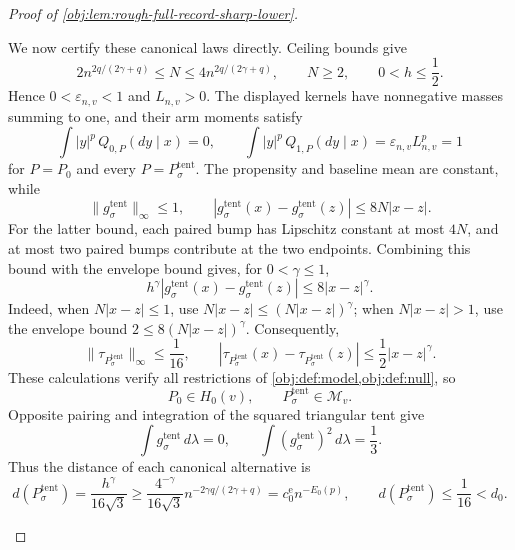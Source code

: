 \begin{proof}[Proof of \cref{obj:lem:rough-full-record-sharp-lower}]
\begin{enumerate}
We now certify these canonical laws directly. Ceiling bounds give
\[
2n^{2q/(2\gamma+q)}\le N\le4n^{2q/(2\gamma+q)},
\qquad N\ge2,
\qquad 0<h\le\frac12.
\]
Hence \(0<\varepsilon_{n,v}<1\) and \(L_{n,v}>0\). The displayed kernels have nonnegative masses summing to one, and their arm moments satisfy
\[
\int |y|^p\,Q_{0,P}(dy\mid x)=0,
\qquad
\int |y|^p\,Q_{1,P}(dy\mid x)
=\varepsilon_{n,v}L_{n,v}^p=1
\]
for \(P=P_0\) and every \(P=P^{\mathrm{tent}}_\sigma\).
The propensity and baseline mean are constant, while
\[
\|g^{\mathrm{tent}}_\sigma\|_\infty\le1,
\qquad
|g^{\mathrm{tent}}_\sigma(x)-g^{\mathrm{tent}}_\sigma(z)|
\le8N|x-z|.
\]
For the latter bound, each paired bump has Lipschitz constant at most \(4N\), and at most two paired bumps contribute at the two endpoints. Combining this bound with the envelope bound gives, for \(0<\gamma\le1\),
\[
h^\gamma
|g^{\mathrm{tent}}_\sigma(x)-g^{\mathrm{tent}}_\sigma(z)|
\le8|x-z|^\gamma.
\]
Indeed, when \(N|x-z|\le1\), use
\(N|x-z|\le(N|x-z|)^\gamma\); when \(N|x-z|>1\), use the envelope bound \(2\le8(N|x-z|)^\gamma\).
Consequently,
\[
\|\tau_{P^{\mathrm{tent}}_\sigma}\|_\infty\le\frac1{16},
\qquad
|\tau_{P^{\mathrm{tent}}_\sigma}(x)
-\tau_{P^{\mathrm{tent}}_\sigma}(z)|
\le\frac12|x-z|^\gamma.
\]
These calculations verify all restrictions of
\cref{obj:def:model,obj:def:null}, so
\[
P_0\in H_0(v),
\qquad P^{\mathrm{tent}}_\sigma\in\mathcal M_v.
\]
Opposite pairing and integration of the squared triangular tent give
\[
\int g^{\mathrm{tent}}_\sigma\,d\lambda=0,
\qquad
\int (g^{\mathrm{tent}}_\sigma)^2\,d\lambda=\frac13.
\]
Thus the distance of each canonical alternative is
\[
d(P^{\mathrm{tent}}_\sigma)
=\frac{h^\gamma}{16\sqrt3}
\ge\frac{4^{-\gamma}}{16\sqrt3}
 n^{-2\gamma q/(2\gamma+q)}
=c_0^{\mathrm e}n^{-E_0(p)},
\qquad
d(P^{\mathrm{tent}}_\sigma)\le\frac1{16}<d_0.
\]


\end{enumerate}
\end{proof}

